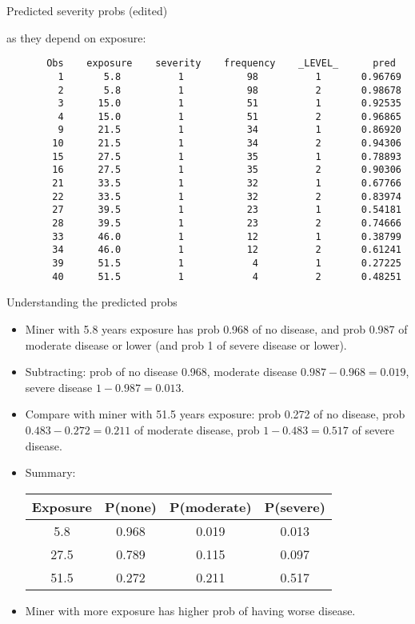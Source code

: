 \documentclass[pdf]{prosper}
\begin{document}
\begin{slide}{Predicted severity probs (edited)}

as they depend on exposure:

{\scriptsize
\begin{verbatim}
       Obs    exposure    severity    frequency    _LEVEL_      pred  
         1       5.8          1           98          1       0.96769 
         2       5.8          1           98          2       0.98678 
         3      15.0          1           51          1       0.92535 
         4      15.0          1           51          2       0.96865 
         9      21.5          1           34          1       0.86920 
        10      21.5          1           34          2       0.94306 
        15      27.5          1           35          1       0.78893 
        16      27.5          1           35          2       0.90306 
        21      33.5          1           32          1       0.67766 
        22      33.5          1           32          2       0.83974 
        27      39.5          1           23          1       0.54181 
        28      39.5          1           23          2       0.74666 
        33      46.0          1           12          1       0.38799 
        34      46.0          1           12          2       0.61241 
        39      51.5          1            4          1       0.27225 
        40      51.5          1            4          2       0.48251 
\end{verbatim}
}
  
\end{slide}

\begin{slide}{Understanding the predicted probs}

  \begin{itemize}
  \item Miner with 5.8 years exposure has prob 0.968 of no disease, and prob 0.987 of moderate disease or lower (and prob 1 of severe disease or lower).
  \item Subtracting: prob of no disease 0.968, moderate disease $0.987-0.968=0.019$, severe disease $1-0.987=0.013$.
  \item Compare with miner with 51.5 years exposure: prob 0.272 of no disease, prob $0.483-0.272=0.211$ of moderate disease, prob $1-0.483=0.517$ of severe disease.
  \item Summary:

    \begin{tabular}{cccc}
      \hline
      Exposure & P(none) & P(moderate) & P(severe)\\
      \hline
      5.8 & 0.968 & 0.019 & 0.013\\
      27.5 & 0.789 & 0.115 & 0.097\\
      51.5 & 0.272 & 0.211 & 0.517\\
      \hline
    \end{tabular}
  \item Miner with more exposure has higher prob of having worse disease.
  \end{itemize}
  
\end{slide}
\end{document}
